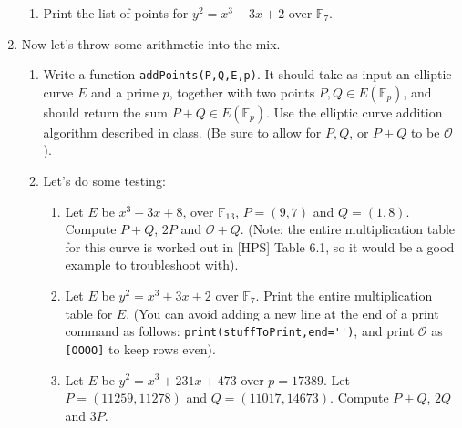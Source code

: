 \documentclass[11pt]{article}
\newcommand{\bF}{\mathbb{F}}
\newcommand{\cO}{\mathcal{O}}
\begin{document}
\begin{enumerate}
{\begin{enumerate}
{\begin{enumerate}
    \end{enumerate}
    }
    \item{
    Print the list of points for $y^2 = x^3 + 3x + 2$ over $\bF_7$.
    }
  \end{enumerate}
  }
  \item{
  Now let's throw some arithmetic into the mix.
  \begin{enumerate}
    \item{
    Write a function \verb|addPoints(P,Q,E,p)|.  It should take as input an elliptic curve $E$ and a prime $p$, together with two points $P,Q\in E(\bF_p)$, and should return the sum $P+Q\in E(\bF_p)$.  Use the elliptic curve addition algorithm described in class.  (Be sure to allow for $P,Q$, or $P+Q$ to be $\cO$).
    }
    \item{
    Let's do some testing:
    \begin{enumerate}
      \item{
      Let $E$ be $x^3 + 3x + 8$, over $\bF_{13}$,  $P=(9,7)$ and $Q = (1,8)$.  Compute $P+Q$, $2P$ and $\cO+Q$.  (Note: the entire multiplication table for this curve is worked out in [HPS] Table 6.1, so it would be a good example to troubleshoot with).
      }
      \item{
      Let $E$ be $y^2 = x^3 + 3x + 2$ over $\bF_7$.  Print the entire multiplication table for $E$.  (You can avoid adding a new line at the end of a print command as follows: \verb|print(stuffToPrint,end='')|, and print $\cO$ as \verb|[OOOO]| to keep rows even).
      }
      \item{
      Let $E$ be $y^2 = x^3 + 231x + 473$ over $p=17389$.  Let $P = (11259,11278)$ and $Q = (11017,14673)$.  Compute $P+Q$, $2Q$ and $3P$.
      }
    \end{enumerate}
    }
  \end{enumerate}
  }
  \end{enumerate}
\end{document}

